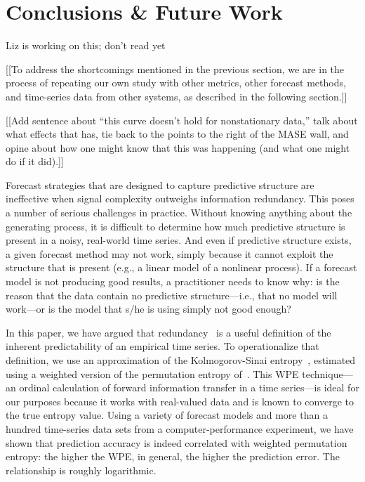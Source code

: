 \section{ Conclusions \& Future Work }\label{sec:conc}

\alert{Liz is working on this; don't read yet}

[[To address the shortcomings mentioned in the previous section, we
    are in the process of repeating our own study with other metrics,
    other forecast methods, and time-series data from other systems,
    as described in the following section.]]

[[Add sentence about ``this curve doesn't hold for nonstationary data,''
talk about what effects that has, tie back to the points to the right
of the MASE wall, and opine about how one might know that this was
happening (and what one might do if it did).]]

Forecast strategies that are designed to capture predictive structure
are ineffective when signal complexity outweighs information
redundancy.  This poses a number of serious challenges in practice.
Without knowing anything about the generating process, it is difficult
to determine how much predictive structure is present in a noisy,
real-world time series.  And even if predictive structure exists, a
given forecast method may not work, simply because it cannot exploit
the structure that is present (e.g., a linear model of a nonlinear
process).  If a forecast model is not producing good results, a
practitioner needs to know why: is the reason that the data contain no
predictive structure---i.e., that no model will work---or is the model
that s/he is using simply not good enough?

In this paper, we have argued that redundancy~\cite{crutchfield2003}
is a useful definition of the inherent predictability of an empirical
time series.  To operationalize that definition, we use an
approximation of the Kolmogorov-Sinai entropy~\cite{lind95}, estimated
using a weighted version of the permutation entropy
of~\cite{bandt2002per}.  This WPE technique---an ordinal calculation
of forward information transfer in a time series---is ideal for our
purposes because it works with real-valued data and is known to
converge to the true entropy value. Using a variety of forecast models
and more than a hundred time-series data sets from a
computer-performance experiment, we have shown that prediction
accuracy is indeed correlated with weighted permutation entropy: the
higher the WPE, in general, the higher the prediction error.  The
relationship is roughly logarithmic.  

